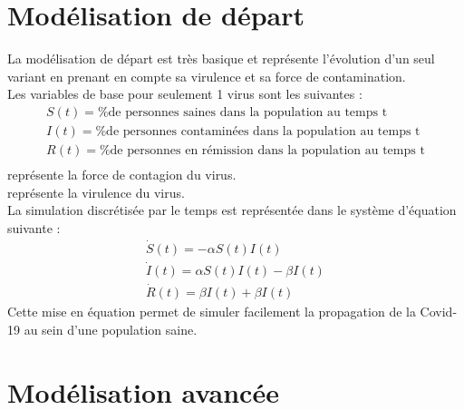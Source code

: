 \documentclass{article}
\begin{document}
\section{Modélisation de départ}

La modélisation de départ est très basique et représente l'évolution d'un seul variant en prenant en compte sa virulence et sa force de contamination.\\
\noindent
Les variables de base pour seulement 1 virus sont les suivantes :
\begin{align}
    S(t)= \text{\% de personnes saines dans la population au temps t} \\
    I(t)= \text{\% de personnes contaminées dans la population au temps t} \\
    R(t)= \text{\% de personnes en rémission dans la population au temps t} \\
\end{align}
\noindent
\textalpha \space représente la force de contagion du virus. \\
\textbeta \space représente la virulence du virus. \\
\noindent
La simulation discrétisée par le temps est représentée dans le système d'équation suivante :
\begin{align}
    \dot{S}(t)= -\alpha S(t)I(t) \\
    \dot{I}(t)= \alpha S(t)I(t)-\beta I(t) \\
    \dot{R}(t)= \beta I(t) + \beta I(t)
\end{align}
\noindent
Cette mise en équation permet de simuler facilement la propagation de la Covid-19 au sein d'une population saine.\\

\section{Modélisation avancée}
\end{document}
